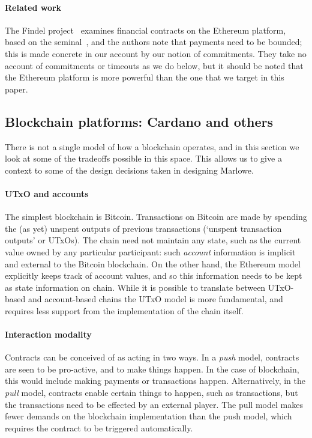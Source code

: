 \documentclass[
      acmsmall
    , screen
    , review=true
  ]{acmart}
\begin{document}
\paragraph{Related work}

The Findel project~\cite{findel} examines financial contracts on the Ethereum platform, based on the seminal~\cite{PeytonJones:2000}, and the authors note that payments need to be bounded; this is made concrete in our account by our notion of commitments. They take no account of commitments or timeouts as we do below, but it should be noted that the Ethereum platform is more powerful than the one that we target in this paper.


\subsection{Blockchain platforms: Cardano and others}

There is not a single model of how a blockchain operates, and in this section we look at some of the tradeoffs possible in this space. This allows us to give a context to some of the design decisions taken in designing Marlowe.  

\paragraph{UTxO and accounts}

The simplest blockchain is Bitcoin. Transactions on Bitcoin are made by spending the (as yet) unspent outputs of 
previous transactions (`unspent transaction outputs' or UTxOs). The chain need not maintain any state, such as the 
current value owned by any particular participant: such \emph{account} information is implicit and external to the 
Bitcoin blockchain. On the other hand, the Ethereum model explicitly keeps track of account values, and so this 
information needs to be kept as state information on chain. While it is possible to translate between UTxO-based and 
account-based chains  the UTxO model is more fundamental, and requires less support from the 
implementation of the chain itself.

\paragraph{Interaction modality}

Contracts can be conceived of as acting in two ways. In a \emph{push} model, contracts are seen to be pro-active, and to 
make things happen. In the case of blockchain, this would include making payments or transactions happen. 
Alternatively, in the \emph{pull} model, contracts enable certain things to happen, such as transactions, but the 
transactions need to be effected by an external player. The pull model makes fewer demands on the blockchain 
implementation than the push model, which requires the contract to be triggered automatically.
\end{document}

